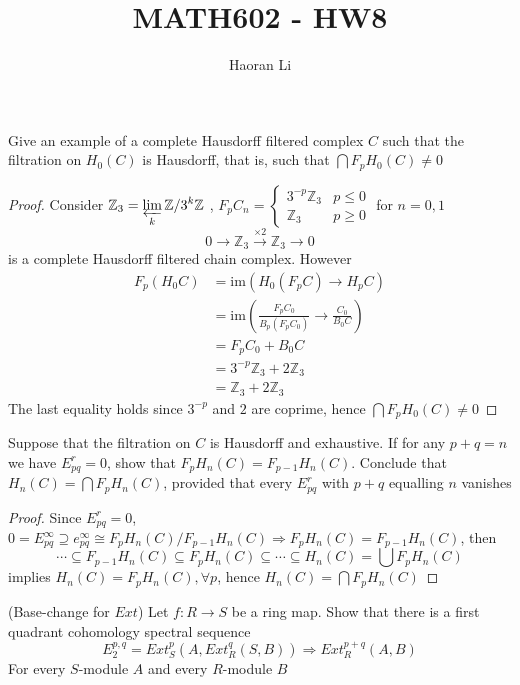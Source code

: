 \documentclass{article}
\title{MATH602 - HW8}
\author{Haoran Li}
\date{}
\newenvironment{exercise}[2][Exercise]{\begin{trivlist}
\item[\hskip \labelsep {\bfseries #1}\hskip \labelsep {\bfseries #2.}]}{\end{trivlist}}
\theoremstyle{definition}
\theoremstyle{remark}
\theoremstyle{definition}
\begin{document}
\sloppy %

\maketitle
\begin{exercise}{\textbf{5.5.1}}
Give an example of a complete Hausdorff filtered complex $C$ such that the filtration on $H_0(C)$ is Hausdorff, that is, such that $\bigcap F_pH_0(C)\neq0$
\end{exercise}

\begin{proof}
Consider $\displaystyle\mathbb Z_3=\varprojlim_k\mathbb Z/3^k\mathbb Z$ , $F_pC_n=\begin{cases}
3^{-p}\mathbb Z_3 &p\leq0 \\
\mathbb Z_3 &p\geq0
\end{cases}$ for $n=0,1$
\[0\to\mathbb Z_3\xrightarrow{\times2}\mathbb Z_3\to0\]
is a complete Hausdorff filtered chain complex. However
\begin{align*}
F_p(H_0C)&=\mathrm{im}(H_0(F_pC)\to H_pC) \\
&=\mathrm{im}\left(\frac{F_pC_0}{B_p(F_pC_0)}\to \frac{C_0}{B_0C}\right) \\
&=F_pC_0+B_0C \\
&=3^{-p}\mathbb Z_3+2\mathbb Z_3 \\
&=\mathbb Z_3+2\mathbb Z_3
\end{align*}
The last equality holds since $3^{-p}$ and $2$ are coprime, hence $\bigcap F_pH_0(C)\neq0$
\end{proof}

\begin{exercise}{\textbf{5.5.3}}
Suppose that the filtration on $C$ is Hausdorff and exhaustive. If for any $p+q=n$ we have $E^r_{pq}=0$, show that $F_pH_n(C)=F_{p-1}H_n(C)$. Conclude that $H_n(C)=\bigcap F_pH_n(C)$, provided that every $E^r_{pq}$ with $p+q$ equalling $n$ vanishes
 \end{exercise}

\begin{proof}
Since $E^r_{pq}=0$, $0=E^\infty_{pq}\supseteq e^\infty_{pq}\cong F_pH_n(C)/F_{p-1}H_n(C)\Rightarrow F_pH_n(C)=F_{p-1}H_n(C)$, then 
\[\cdots\subseteq F_{p-1}H_n(C)\subseteq F_pH_n(C)\subseteq\cdots\subseteq H_n(C)=\bigcup F_pH_n(C)\]
implies $H_n(C)=F_pH_n(C), \forall p$, hence $H_n(C)=\bigcap F_pH_n(C)$
\end{proof}

\begin{exercise}{\textbf{5.6.3}}(Base-change for $Ext$)
Let $f:R\to S$ be a ring map. Show that there is a first quadrant cohomology spectral sequence
\[E^{p,q}_2=Ext_S^p(A,Ext^q_R(S,B))\Rightarrow Ext_R^{p+q}(A,B)\]
For every $S$-module $A$ and every $R$-module $B$
\end{exercise}
\end{document}
